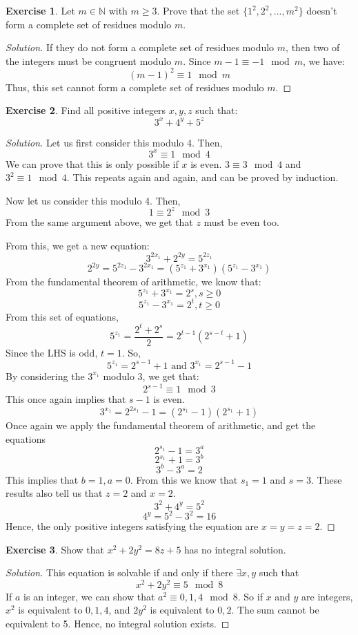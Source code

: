 \documentclass[12pt,letterpaper]{book}
\theoremstyle{definition}
\newtheorem*{exercise}{Exercise}
\newenvironment{solution}
  {\renewcommand\qedsymbol{$\blacksquare$}\begin{proof}[Solution]}
  {\end{proof}}
\newcommand{\N}{\mathbb{N}}
\begin{document}
\begin{exercise}
  Let $m \in \N$ with $m \geq 3$. Prove that the set $\{1^2,2^2,...,m^2\}$ doesn't form a complete set of residues modulo $m$.
\end{exercise}
\begin{solution}
  If they do not form a complete set of residues modulo $m$, then two of the integers must be congruent modulo $m$. Since $m-1 \equiv -1 \mod m$, we have:
  \[(m-1)^2 \equiv 1 \mod m\]
  Thus, this set cannot form a complete set of residues modulo $m$.
\end{solution}

\begin{exercise}
  Find all positive integers $x,y,z$ such that:
  \[3^x + 4^y + 5^z\]
\end{exercise}
\begin{solution}
  Let us first consider this modulo 4. Then,
  \[3^x \equiv 1 \mod 4\]
  We can prove that this is only possible if $x$ is even. $3 \equiv 3 \mod 4$ and $3^2 \equiv 1 \mod 4$. This repeats again and again, and can be proved by induction.

  Now let us consider this modulo 4. Then,
  \[1 \equiv 2^z \mod 3\]
  From the same argument above, we get that $z$ must be even too.

  From this, we get a new equation:
  \[3^{2x_1} + 2^{2y} = 5^{2z_1}\]
  \[2^{2y} = 5^{2z_1} - 3^{2x_1} = (5^{z_1} + 3^{x_1})(5^{z_1} - 3^{x_1})\]
  From the fundamental theorem of arithmetic, we know that:
  \[5^{z_1} + 3^{x_1} = 2^s, s \geq 0\]
  \[5^{z_1} - 3^{x_1} = 2^t, t \geq 0\]
  From this set of equations,
  \[5^{z_1} = \frac{2^t+2^s}{2} = 2^{t-1}(2^{s-t}+1)\]
  Since the LHS is odd, $t = 1$. So,
  \[5^{z_1} = 2^{s-1}+1 \text{ and } 3^{x_1} = 2^{s-1}-1\]
  By considering the $3^{x_1}$ modulo 3, we get that:
  \[2^{s-1} \equiv 1 \mod 3\]
  This once again implies that $s-1$ is even.
  \[3^{x_1} = 2^{2s_1} - 1 = (2^{s_1} - 1)(2^{s_1} + 1)\]
  Once again we apply the fundamental theorem of arithmetic, and get the equations
  \[2^{s_1}-1 = 3^a\]
  \[2^{s_1}+1 = 3^b\]
  \[3^b-3^a = 2\]
  This implies that $b = 1, a = 0$. From this we know that $s_1 = 1$ and $s = 3$. These results also tell us that $z = 2$ and $x=2$.
  \[3^2+4^y = 5^2\]
  \[4^y = 5^2 - 3^2 = 16\]
  Hence, the only positive integers satisfying the equation are $x=y=z=2$.
\end{solution}

\begin{exercise}
  Show that $x^2 + 2y^2 = 8z + 5$ has no integral solution.
\end{exercise}
\begin{solution}
  This equation is solvable if and only if there $\exists x,y$ such that
  \[x^2 + 2y^2 \equiv 5 \mod 8\]
  If $a$ is an integer, we can show that $a^2 \equiv 0,1,4 \mod 8$. So if $x$ and $y$ are integers, $x^2$ is equivalent to $0,1,4$, and $2y^2$ is equivalent to $0,2$. The sum cannot be equivalent to 5. Hence, no integral solution exists.
\end{solution}
\end{document}
